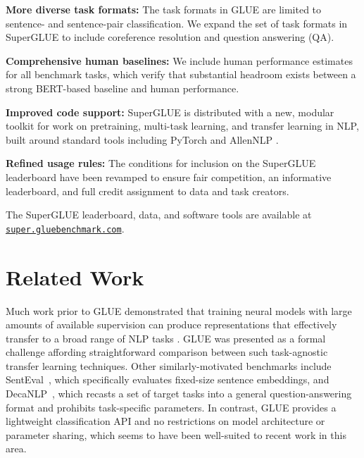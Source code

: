 \textbf{More diverse task formats:} The task formats in GLUE are limited to sentence- and sentence-pair classification. We expand the set of task formats in SuperGLUE to include coreference resolution and question answering (QA). 

\textbf{Comprehensive human baselines:} We include human performance estimates for all benchmark tasks, which verify that substantial headroom exists between a strong BERT-based baseline and human performance.

\textbf{Improved code support:} SuperGLUE is distributed with a new, modular toolkit for work on pretraining, multi-task learning, and transfer learning in NLP, built around standard tools including PyTorch \citep{paszke2017automatic} and AllenNLP \citep{Gardner2017AllenNLP}.

\textbf{Refined usage rules:} The conditions for inclusion on the SuperGLUE leaderboard have been revamped to ensure fair competition, an informative leaderboard, and full credit assignment to data and task creators.

The SuperGLUE leaderboard, data, and software tools are available at \href{https://super.gluebenchmark.com/}{\tt super.gluebenchmark.com}.

\section{Related Work}

Much work prior to GLUE demonstrated that training neural models with large amounts of available supervision can produce representations that effectively transfer to a broad range of NLP tasks \citep{collobert2008unified,dai2015semisupervised,kiros2015skip,hill2016learning,conneau2018senteval,mccann2017learned,peters2018deep}.
GLUE was presented as a formal challenge affording straightforward comparison between such task-agnostic transfer learning techniques.
Other similarly-motivated benchmarks include SentEval~\citep{conneau2018senteval}, which specifically evaluates fixed-size sentence embeddings, and DecaNLP~\citep{mccann2018decanlp}, which recasts a set of target tasks into a general question-answering format and prohibits task-specific parameters. In contrast, GLUE provides a lightweight classification API and no restrictions on model architecture or parameter sharing, which seems to have been well-suited to recent work in this area.

